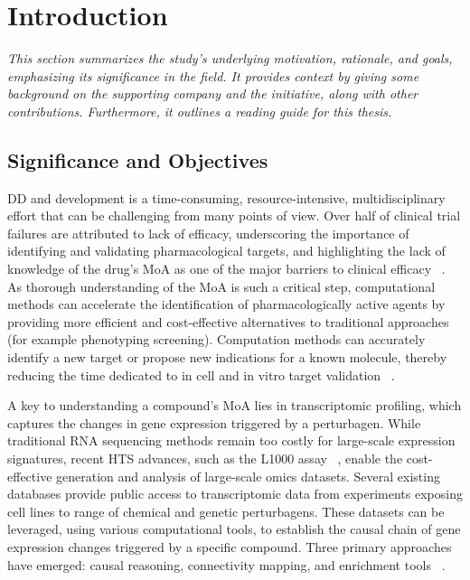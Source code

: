 
%

\makeatletter
\newcommand{\ntifpkgloaded}{%
  \@ifpackageloaded%
}
\makeatother

\chapter{Introduction}
\label{cha:introduction}

\textit{This section summarizes the study's underlying motivation, rationale, and goals, emphasizing its significance in the field. It provides context by giving some background on the supporting company and the initiative, along with other contributions. Furthermore, it outlines a reading guide for this thesis.}

\section{Significance and Objectives} %
\label{sec:significance_and_objectives}


\gls{DD} and development is a time-consuming, resource-intensive, multidisciplinary effort that can be challenging from many points of view. 
Over half of clinical trial failures are attributed to lack of efficacy, underscoring the importance of identifying and validating pharmacological targets, and highlighting the lack of knowledge of the drug's \gls{MoA} as one of the major barriers to clinical efficacy ~\cite{RN1, RN2, RN3}. 
As thorough understanding of the MoA is such a critical step, computational methods can accelerate the identification of pharmacologically active agents by providing more efficient and cost-effective alternatives to traditional approaches (for example phenotyping screening). 
Computation methods can accurately identify a new target or propose new indications for a known molecule, thereby reducing the time dedicated to in cell and in vitro target validation ~\cite{RN29}.

A key to understanding a compound's MoA lies in transcriptomic profiling, which captures the changes in gene expression triggered by a perturbagen. 
While traditional RNA sequencing methods remain too costly for large-scale expression signatures, recent \gls{HTS} advances, such as the L1000 assay ~\cite{RN30}, enable the cost-effective generation and analysis of large-scale omics datasets. 
Several existing databases provide public access to transcriptomic data from experiments exposing cell lines to range of chemical and genetic perturbagens. 
These datasets can be leveraged, using various computational tools, to establish the causal chain of gene expression changes triggered by a specific compound. 
Three primary approaches have emerged: causal reasoning, connectivity mapping, and enrichment tools ~\cite{RN38}.

